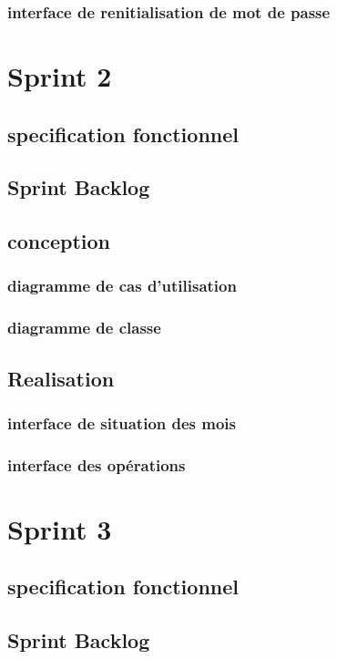 \subsubsection{interface de renitialisation de mot de passe}



\section{Sprint 2}
\subsection{specification fonctionnel}
\subsection{Sprint Backlog}
\subsection{conception}
\subsubsection{diagramme de cas d'utilisation}

\subsubsection{diagramme de classe}

\subsection{Realisation}
\subsubsection{interface de situation des mois}
\subsubsection{interface des opérations}



\section{Sprint 3}
\subsection{specification fonctionnel}
\subsection{Sprint Backlog}

